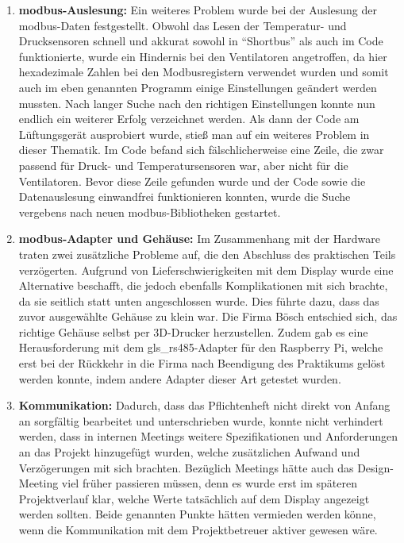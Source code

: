 \begin{enumerate}
	\item \textbf{\gls{modbus}-Auslesung:} Ein weiteres Problem wurde bei der Auslesung der \gls{modbus}-Daten festgestellt. Obwohl das Lesen der Temperatur- und Drucksensoren schnell und akkurat sowohl in \enquote{Shortbus} als auch im Code funktionierte, wurde ein Hindernis bei den Ventilatoren angetroffen, da hier hexadezimale Zahlen bei den Modbusregistern verwendet wurden und somit auch im eben genannten Programm einige Einstellungen geändert werden mussten. Nach langer Suche nach den richtigen Einstellungen konnte nun endlich ein weiterer Erfolg verzeichnet werden. Als dann der Code am Lüftungsgerät ausprobiert wurde, stieß man auf ein weiteres Problem in dieser Thematik. Im Code befand sich fälschlicherweise eine Zeile, die zwar passend für Druck- und Temperatursensoren war, aber nicht für die Ventilatoren. Bevor diese Zeile gefunden wurde und der Code sowie die Datenauslesung einwandfrei funktionieren konnten, wurde die Suche vergebens nach neuen \gls{modbus}-Bibliotheken gestartet.
	\item \textbf{\gls{modbus}-Adapter und Gehäuse:} Im Zusammenhang mit der Hardware traten zwei zusätzliche Probleme auf, die den Abschluss des praktischen Teils verzögerten. Aufgrund von Lieferschwierigkeiten mit dem Display wurde eine Alternative beschafft, die jedoch ebenfalls Komplikationen mit sich brachte, da sie seitlich statt unten angeschlossen wurde. Dies führte dazu, dass das zuvor ausgewählte Gehäuse zu klein war. Die Firma Bösch entschied sich, das richtige Gehäuse selbst per 3D-Drucker herzustellen. Zudem gab es eine Herausforderung mit dem \gls{gls_rs485}-Adapter für den Raspberry Pi, welche erst bei der Rückkehr in die Firma nach Beendigung des Praktikums gelöst werden konnte, indem andere Adapter dieser Art getestet wurden.
	\item \textbf{Kommunikation:} Dadurch, dass das Pflichtenheft nicht direkt von Anfang an sorgfältig bearbeitet und unterschrieben wurde, konnte nicht verhindert werden, dass in internen Meetings weitere Spezifikationen und Anforderungen an das Projekt hinzugefügt wurden, welche zusätzlichen Aufwand und Verzögerungen mit sich brachten. Bezüglich Meetings hätte auch das Design-Meeting viel früher passieren müssen, denn es wurde erst im späteren Projektverlauf klar, welche Werte tatsächlich auf dem Display angezeigt werden sollten. Beide genannten Punkte hätten vermieden werden könne, wenn die Kommunikation mit dem Projektbetreuer aktiver gewesen wäre.
\end{enumerate}
